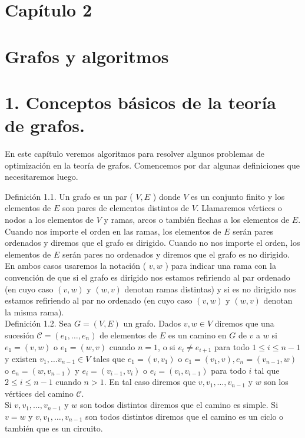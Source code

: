 \documentclass[10pt]{article}
\begin{document}
\section*{Capítulo 2}
\section*{Grafos y algoritmos}
\section*{1. Conceptos básicos de la teoría de grafos.}
En este capítulo veremos algoritmos para resolver algunos problemas de optimización en la teoría de grafos. Comencemos por dar algunas definiciones que necesitaremos luego.

Definición 1.1. Un grafo es un par ( $V, E$ ) donde $V$ es un conjunto finito y los elementos de $E$ son pares de elementos distintos de $V$. Llamaremos vértices o nodos a los elementos de $V$ y ramas, arcos o también flechas a los elementos de $E$.\\
Cuando nos importe el orden en las ramas, los elementos de $E$ serán pares ordenados y diremos que el grafo es dirigido. Cuando no nos importe el orden, los elementos de $E$ serán pares no ordenados y diremos que el grafo es no dirigido. En ambos casos usaremos la notación ( $v, w$ ) para indicar una rama con la convención de que si el grafo es dirigido nos estamos refiriendo al par ordenado (en cuyo caso $(v, w)$ y $(w, v)$ denotan ramas distintas) y si es no dirigido nos estamos refiriendo al par no ordenado (en cuyo caso $(v, w)$ y $(w, v)$ denotan la misma rama).\\
Definición 1.2. Sea $G=(V, E)$ un grafo. Dados $v, w \in V$ diremos que una sucesión $\mathcal{C}=\left(e_{1}, \ldots, e_{n}\right)$ de elementos de $E$ es un camino en $G$ de $v$ a $w$ si $e_{1}=(v, w)$ o $e_{1}=(w, v)$ cuando $n=1$, o si $e_{i} \neq e_{i+1}$ para todo $1 \leq i \leq n-1$ y existen $v_{1}, \ldots v_{n-1} \in V$ tales que $e_{1}=\left(v, v_{1}\right)$ o $e_{1}=\left(v_{1}, v\right), e_{n}=\left(v_{n-1}, w\right)$ o $e_{n}=\left(w, v_{n-1}\right)$ y $e_{i}=\left(v_{i-1}, v_{i}\right)$ o $e_{i}=\left(v_{i}, v_{i-1}\right)$ para todo $i$ tal que $2 \leq i \leq n-1$ cuando $n>1$. En tal caso diremos que $v, v_{1}, \ldots, v_{n-1}$ y $w$ son los vértices del camino $\mathcal{C}$.\\
Si $v, v_{1}, \ldots, v_{n-1}$ y $w$ son todos distintos diremos que el camino es simple. Si $v=w$ y $v, v_{1}, \ldots, v_{n-1}$ son todos distintos diremos que el camino es un ciclo o también que es un circuito.\\
\end{document}
